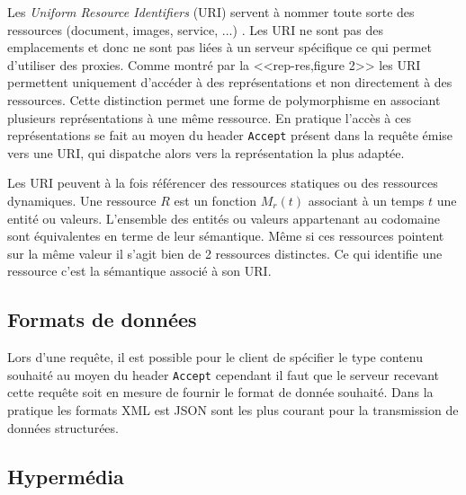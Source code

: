 \documentclass[a4paper, 11pt]{report}
\begin{document}
Les \emph{Uniform Resource Identifiers} (URI) servent à nommer toute
sorte des ressources (document, images, service, ...)
\cite{masinter2005uniform}.  Les URI ne sont pas des emplacements et
donc ne sont pas liées à un serveur spécifique ce qui permet
d'utiliser des proxies.  Comme montré par la <<rep-res,figure 2>> les
URI permettent uniquement d'accéder à des représentations et non
directement à des ressources.  Cette distinction permet une forme de
polymorphisme en associant plusieurs représentations à une même
ressource.  En pratique l'accès à ces représentations se fait au moyen
du header \verb=Accept= présent dans la requête émise vers une URI,
qui dispatche alors vers la représentation la plus adaptée.

\begin{center}
\end{center}

Les URI peuvent à la fois référencer des ressources statiques ou des
ressources dynamiques.  Une ressource $R$ est un fonction $M_r(t)$
associant à un temps $t$ une entité ou valeurs.  L'ensemble des
entités ou valeurs appartenant au codomaine sont équivalentes en terme
de leur sémantique.  Même si ces ressources pointent sur la même
valeur il s'agit bien de 2 ressources distinctes.  Ce qui identifie
une ressource c'est la sémantique associé à son URI.

\subsection{Formats de données}

Lors d'une requête, il est possible pour le client de spécifier le
type contenu souhaité au moyen du header \verb=Accept= cependant il
faut que le serveur recevant cette requête soit en mesure de fournir
le format de donnée souhaité.  Dans la pratique les formats XML est
JSON sont les plus courant pour la transmission de données
structurées.

\subsection{Hypermédia}
\end{document}
